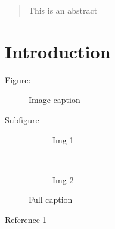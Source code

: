 \begin{abstract}
This is an abstract
\end{abstract}

\section{Introduction}

Figure:

\begin{figure}[h]
	\centering
	\caption[short caption]{Image caption}
	\label{fig:}
\end{figure}

Subfigure\\

\begin{figure}[h]
	\centering
	\begin{subfigure}{0.45\textwidth}
		\caption{Img 1}
		\label{fig:img1}
	\end{subfigure}
	~ %
	\begin{subfigure}{0.45\textwidth}
		\caption{Img 2}
		\label{fig:img2}
	\end{subfigure}
	\caption[Full caption short]
	{Full caption}
	\label{fig:double_fig}
\end{figure}


Reference \ref{fig:}\\
